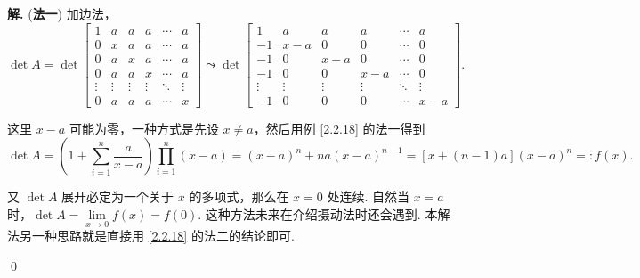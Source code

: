 \documentclass[10pt,openany]{article}
\theoremstyle{thmstyle} %
\theoremstyle{defstyle} %
\theoremstyle{prostyle} %
\theoremstyle{exastyle}
\theoremstyle{remstyle}
\newenvironment{solution}{\par\underline{\textbf{解.}} \;\fangsong}{\qed\par}
\begin{document}
\begin{solution}
	(\textbf{法一}) 加边法，
	\[ \det A= \det \begin{bmatrix}
		1 & a & a & a & \cdots & a \\
		0 & x & a & a & \cdots & a \\
		0 & a & x & a & \cdots & a \\
		0 & a & a & x & \cdots & a \\
		\vdots & \vdots & \vdots & \vdots & \ddots & \vdots \\
		0 & a & a & a & \cdots & x
	\end{bmatrix} \leadsto  \det \begin{bmatrix}
	1 & a & a & a & \cdots & a \\
	-1 & x-a & 0 & 0 & \cdots & 0 \\
	-1 & 0 & x-a & 0 & \cdots & 0 \\
	-1 & 0 & 0 & x-a & \cdots & 0 \\
	\vdots & \vdots & \vdots & \vdots & \ddots & \vdots \\
	-1 & 0 & 0 & 0 & \cdots & x-a
	\end{bmatrix}. \]
	
	这里 \( x-a \) 可能为零，一种方式是先设 \( x \neq a \)，然后用例 \ref{2.2.18} 的法一得到
	\[ \det A= \left( 1+ \sum_{i=1}^{n}\frac{a}{x-a} \right) \prod_{i=1}^{n} (x-a)= (x-a)^n+na(x-a)^{n-1}=[x+(n-1)a](x-a)^n=:f(x). \]
	
	又 \( \det A \) 展开必定为一个关于 \( x \) 的多项式，那么在 \( x=0 \) 处连续. 自然当 \( x=a \) 时，\( \det A=\lim\limits_{x \to 0} f(x)=f(0) \). 这种方法未来在介绍摄动法时还会遇到. 本解法另一种思路就是直接用 \ref{2.2.18} 的法二的结论即可.
	
	\vspace{1ex}
	

\end{solution}
\end{document}
